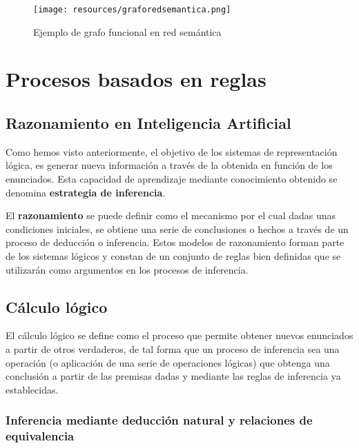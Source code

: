\documentclass[a4paper, 11pt, titlepage]{article}
\begin{document}
        \begin{figure}[htp]
            \centering
            \texttt{[image: resources/graforedsemantica.png]}
            \caption{Ejemplo de grafo funcional en red semántica}
            \label{graforedsemantica}
        \end{figure}    

\section{Procesos basados en reglas}

    \subsection{Razonamiento en Inteligencia Artificial}

        Como hemos visto anteriormente, el objetivo de los sistemas de representación lógica, es 
        generar nueva información a través de la obtenida en función de los enunciados. Esta capacidad 
        de aprendizaje mediante conocimiento obtenido se denomina \textbf{estrategia de inferencia}.

        El \textbf{razonamiento} se puede definir como el mecanismo por el cual dadas unas 
        condiciones iniciales, se obtiene una serie de conclusiones o hechos a través de un proceso 
        de deducción o inferencia. Estos modelos de razonamiento forman parte de los sistemas 
        lógicos y constan de un conjunto de reglas bien definidas que se utilizarán como argumentos 
        en los procesos de inferencia.

    \subsection{Cálculo lógico}\label{calculologico}

        El cálculo lógico se define como el proceso que permite obtener nuevos enunciados a 
        partir de otros verdaderos, de tal forma que un proceso de inferencia sea una operación (o 
        aplicación de una serie de operaciones lógicas) que obtenga una conclusión a partir de las 
        premisas dadas y mediante las reglas de inferencia ya establecidas.

        \subsubsection{Inferencia mediante deducción natural y relaciones de equivalencia}
\end{document}

